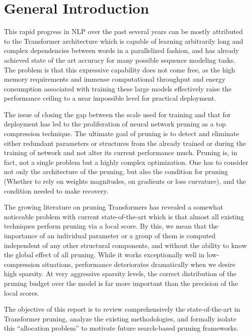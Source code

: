\chapter*{General Introduction}
\label{chap:introduction}


This rapid progress in NLP over the past several years can be mostly attributed to the Transformer architecture which is capable of learning arbitrarily long and complex dependencies between words in a parallelized fashion, and has already achieved state of the art accuracy for many possible sequence modeling tasks. The problem is that this expressive capability does not come free, as the high memory requirements and immense computational throughput and energy consumption associated with training these large models effectively raise the performance ceiling to a near impossible level for practical deployment.

The issue of closing the gap between the scale used for training and that for deployment has led to the proliferation of neural network pruning as a top compression technique. The ultimate goal of pruning is to detect and eliminate either redundant parameters or structures from the already trained or during the training of network and not alter its current performance much. Pruning is, in fact, not a single problem but a highly complex optimization. One has to consider not only the architecture of the pruning, but also the condition for pruning (Whether to rely on weights magnitudes, on gradients or loss curvature), and the condition needed to make recovery.

The growing literature on pruning Transformers has revealed a somewhat noticeable problem with current state-of-the-art which is that almost all existing techniques perform pruning via a local score. By this, we mean that the importance of an individual parameter or a group of them is computed independent of any other structural components, and without the ability to know the global effect of all pruning. While it works exceptionally well in low-compression situations, performance deteriorates dramatically when we desire high sparsity. At very aggressive sparsity levels, the correct distribution of the pruning budget over the model is far more important than the precision of the local scores.

The objective of this report is to review comprehensively the state-of-the-art in Transformer pruning, analyze the existing methodologies, and formally isolate this ``allocation problem'' to motivate future search-based pruning frameworks.

